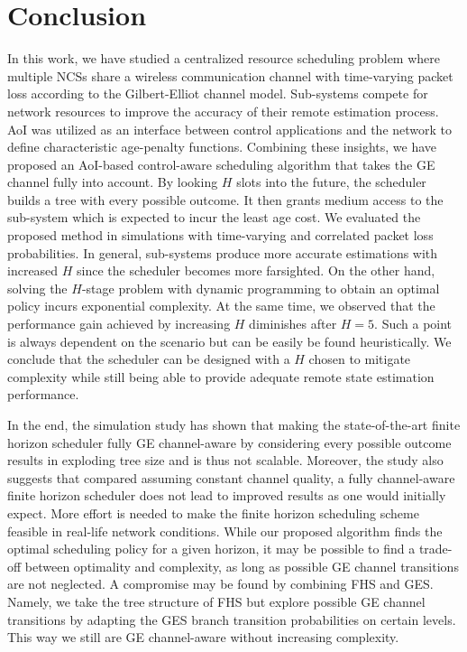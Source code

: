 \chapter{Conclusion}

In this work, we have studied a centralized resource scheduling problem where
multiple NCSs share a wireless communication channel with time-varying packet
loss according to the Gilbert-Elliot channel model. Sub-systems compete for
network resources to improve the accuracy of their remote estimation process.
AoI was utilized as an interface between control applications and the network to
define characteristic age-penalty functions. Combining these insights, we have
proposed an AoI-based control-aware scheduling algorithm that takes the GE
channel fully into account. By looking $H$ slots into the future, the scheduler
builds a tree with every possible outcome. It then grants medium access to the
sub-system which is expected to incur the least age cost. We evaluated the
proposed method in simulations with time-varying and correlated packet loss
probabilities. In general, sub-systems produce more accurate estimations with
increased $H$ since the scheduler becomes more farsighted. On the other hand,
solving the $H$-stage problem with dynamic programming to obtain an optimal
policy incurs exponential complexity. At the same time, we observed that the
performance gain achieved by increasing $H$ diminishes after $H=5$. Such a point
is always dependent on the scenario but can be easily be found heuristically. We
conclude that the scheduler can be designed with a $H$ chosen to mitigate
complexity while still being able to provide adequate remote state estimation
performance. 

In the end, the simulation study has shown that making the state-of-the-art
finite horizon scheduler fully GE channel-aware by considering every possible
outcome results in exploding tree size and is thus not scalable. Moreover, the
study also suggests that compared assuming constant channel quality, a fully
channel-aware finite horizon scheduler does not lead to improved results as one
would initially expect. More effort is needed to make the finite horizon
scheduling scheme feasible in real-life network conditions. While our proposed
algorithm finds the optimal scheduling policy for a given horizon, it may be
possible to find a trade-off between optimality and complexity, as long as
possible GE channel transitions are not neglected. A compromise may be found by
combining FHS and GES. Namely, we take the tree structure of FHS but explore
possible GE channel transitions by adapting the GES branch transition
probabilities on certain levels. This way we still are GE channel-aware without
increasing complexity.

